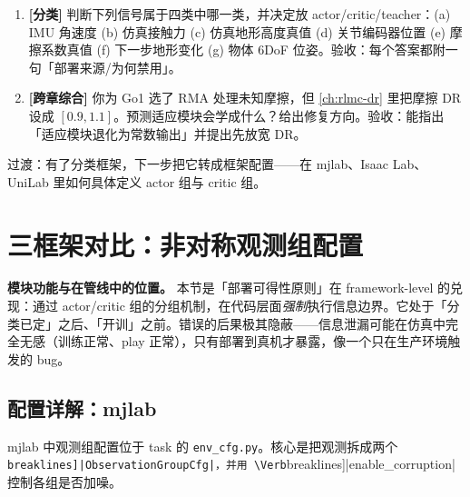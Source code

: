 \begin{practice}[本节练习]
\begin{enumerate}
  \item \textbf{[分类]} 判断下列信号属于四类中哪一类，并决定放 actor/critic/teacher：(a) IMU 角速度 (b) 仿真接触力 (c) 仿真地形高度真值 (d) 关节编码器位置 (e) 摩擦系数真值 (f) 下一步地形变化 (g) 物体 6DoF 位姿。验收：每个答案都附一句「部署来源/为何禁用」。
  \item \textbf{[跨章综合]} 你为 Go1 选了 RMA 处理未知摩擦，但 \cref{ch:rlmc-dr} 里把摩擦 DR 设成 $[0.9,1.1]$。预测适应模块会学成什么？给出修复方向。验收：能指出「适应模块退化为常数输出」并提出先放宽 DR。
\end{enumerate}
\end{practice}

过渡：有了分类框架，下一步把它转成框架配置——在 mjlab、Isaac Lab、UniLab 里如何具体定义 actor 组与 critic 组。

\section{三框架对比：非对称观测组配置}
\label{sec:rlmc-priv-config}

\textbf{模块功能与在管线中的位置。} 本节是「部署可得性原则」在 framework-level 的兑现：通过 actor/critic 组的分组机制，在代码层面\emph{强制}执行信息边界。它处于「分类已定」之后、「开训」之前。错误的后果极其隐蔽——信息泄漏可能在仿真中完全无感（训练正常、play 正常），只有部署到真机才暴露，像一个只在生产环境触发的 bug。

\subsection{配置详解：mjlab}
\label{sec:rlmc-priv-cfg-mjlab}

mjlab 中观测组配置位于 task 的 \verb|env_cfg.py|。核心是把观测拆成两个 \Verb[breaklines]|ObservationGroupCfg|，并用 \Verb[breaklines]|enable_corruption| 控制各组是否加噪。

